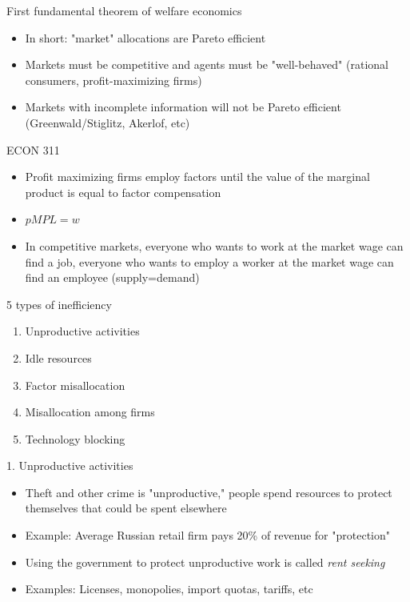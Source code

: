 \documentclass[10pt]{beamer}
\begin{document}
\begin{frame}[label={sec:orgcaa80e6}]{}
\alert{First fundamental theorem of welfare economics}
\begin{itemize}
\item In short: "market" allocations are Pareto efficient
\item Markets must be competitive and agents must be "well-behaved" (rational consumers, profit-maximizing firms)
\item Markets with incomplete information will not be Pareto efficient (Greenwald/Stiglitz, Akerlof, etc)
\end{itemize}
\end{frame}

\begin{frame}[label={sec:org2400c9d}]{}
\alert{ECON 311}
\begin{itemize}
\item Profit maximizing firms employ factors until the value of the marginal product is equal to factor compensation
\item \(pMPL = w\)
\item In competitive markets, everyone who wants to work at the market wage can find a job, everyone who wants to employ a worker at the market wage can find an employee (supply=demand)
\end{itemize}
\end{frame}

\begin{frame}[label={sec:org1410c15}]{}
\alert{5 types of inefficiency}
\begin{enumerate}
\item Unproductive activities
\item Idle resources
\item Factor misallocation
\item Misallocation among firms
\item Technology blocking
\end{enumerate}
\end{frame}

\begin{frame}[label={sec:org9f072e7}]{}
\alert{1. Unproductive activities}
\begin{itemize}
\item Theft and other crime is "unproductive," people spend resources to protect themselves that could be spent elsewhere
\item Example: Average Russian retail firm pays 20\% of revenue for "protection"
\item Using the government to protect unproductive work is called \emph{rent seeking}
\item Examples: Licenses, monopolies, import quotas, tariffs, etc
\end{itemize}
\end{frame}
\end{document}
